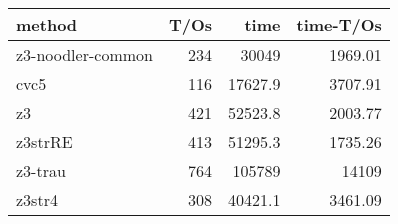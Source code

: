 \begin{tabular}{lrrr}
\hline
 method            &   T/Os &     time &   time-T/Os \\
\hline
 z3-noodler-common &    234 &  30049   &     1969.01 \\
 cvc5              &    116 &  17627.9 &     3707.91 \\
 z3                &    421 &  52523.8 &     2003.77 \\
 z3strRE           &    413 &  51295.3 &     1735.26 \\
 z3-trau           &    764 & 105789   &    14109    \\
 z3str4            &    308 &  40421.1 &     3461.09 \\
\hline
\end{tabular}

